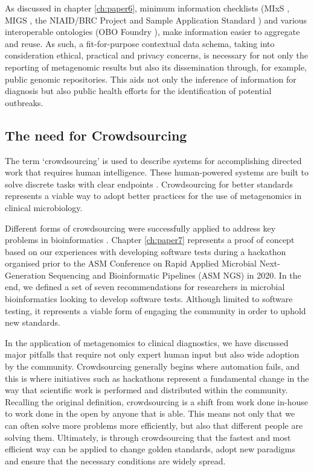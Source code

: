 As discussed in chapter \ref{ch:paper6}, minimum information checklists (MIxS \cite{yilmaz_minimum_2011}, MIGS \cite{field_minimum_2008}, the NIAID/BRC Project and Sample Application Standard \cite{dugan_standardized_2014}) and various interoperable ontologies (OBO Foundry \cite{smith_obo_2007}), make information easier to aggregate and reuse. As such, a fit-for-purpose contextual data schema, taking into consideration ethical, practical and privacy concerns, is necessary for not only the reporting of metagenomic results but also its dissemination through, for example, public genomic repositories. This aids not only the inference of information for diagnosis but also public health efforts for the identification of potential outbreaks.  

\subsection{The need for Crowdsourcing}

The term ‘crowdsourcing’ is used to describe systems for accomplishing directed work that requires human intelligence. These human-powered systems are built to solve discrete tasks with clear endpoints \citep{good_crowdsourcing_2013}. Crowdsourcing for better standards represents a viable way to adopt better practices for the use of metagenomics in clinical microbiology.

Different forms of crowdsourcing were successfully applied to address key problems in bioinformatics \citep{good_crowdsourcing_2013, connor_ncbis_2019, powell_organizing_2021}. Chapter \ref{ch:paper7} represents a proof of concept based on our experiences with developing software tests during a hackathon organised prior to the ASM Conference on Rapid Applied Microbial Next-Generation Sequencing and Bioinformatic Pipelines (ASM NGS) in 2020. In the end, we defined a set of
seven recommendations for researchers in microbial bioinformatics looking to develop software tests. Although limited to software testing, it represents a viable form of engaging the community in order to uphold new standards.

In the application of metagenomics to clinical diagnostics, we have discussed major pitfalls that require not only expert human input but also wide adoption by the community. Crowdsourcing generally begins where automation fails, and this is where initiatives such as hackathons represent a fundamental change in the way that scientific work is performed and distributed within the community. Recalling the original definition, crowdsourcing is a shift from work done in-house to work done in the open by anyone that is able. This means not only that we can often solve more problems more efficiently, but also that different people are solving them. Ultimately, is through crowdsourcing that the fastest and most efficient way can be applied to change golden standards, adopt new paradigms and ensure that the necessary conditions are widely spread. 


